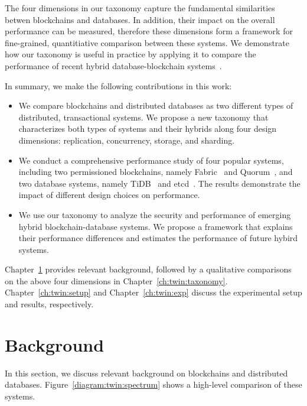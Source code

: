 The four dimensions in our taxonomy capture the fundamental
similarities betwen blockchains and databases. In addition, their impact on the
overall performance can be measured, therefore these dimensions form a framework
for fine-grained, quantitiative comparison between these systems. We demonstrate
how our taxonomy is useful in practice by applying it to compare the performance
of recent hybrid database-blockchain
systems~\cite{BlockchainMeetsDatabase,peng2020falcondb,veritas,el2019blockchaindb,mcconaghy2016bigchaindb,schuhknecht2019chainifydb}.

In summary, we make the following contributions in this work:
\begin{itemize}
  \item We compare blockchains and distributed databases as two different types
  of distributed, transactional systems. We propose a new taxonomy that
  characterizes both types of systems and their hybrids along four
  design dimensions: replication, concurrency, storage, and sharding.

  \item We conduct a comprehensive performance study of four popular systems,
  including two permissioned blockchains, namely Fabric~\cite{web:fabric} and
  Quorum~\cite{web:quorum}, and two database systems, namely
  TiDB~\cite{web:tidb} and etcd~\cite{web:etcd}. The results demonstrate the
  impact of different design choices on performance.
   
  \item We use our taxonomy to analyze the security and performance of emerging
  hybrid blockchain-database systems. We propose a framework that explains their
  performance differences and estimates the performance of future hybird
  systems.
\end{itemize}

Chapter~\ref{ch:twin:background} provides relevant background, followed by a qualitative comparisons on the above
four dimensions in Chapter~\ref{ch:twin:taxonomy}. Chapter~\ref{ch:twin:setup} and Chapter~\ref{ch:twin:exp} discuss the experimental setup and
results, respectively. 



\section{Background}
\label{ch:twin:background}

In this section, we discuss relevant background on blockchains and distributed databases.
Figure~\ref{diagram:twin:spectrum} shows a high-level comparison of these systems.

